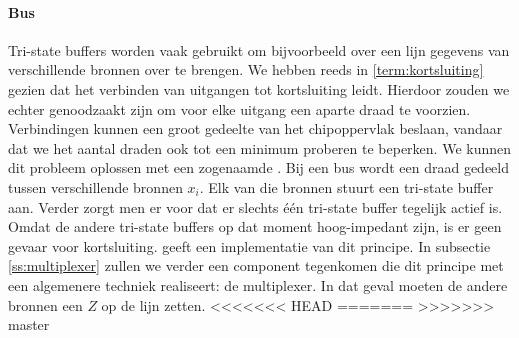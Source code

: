 \paragraph{Bus}Tri-state buffers worden vaak gebruikt om bijvoorbeeld over een lijn gegevens van verschillende bronnen over te brengen. We hebben reeds in \ref{term:kortsluiting} gezien dat het verbinden van uitgangen tot kortsluiting leidt. Hierdoor zouden we echter genoodzaakt zijn om voor elke uitgang een aparte draad te voorzien. Verbindingen kunnen een groot gedeelte van het chipoppervlak beslaan, vandaar dat we het aantal draden ook tot een minimum proberen te beperken. We kunnen dit probleem oplossen met een zogenaamde . Bij een bus wordt een draad gedeeld tussen verschillende bronnen $x_i$. Elk van die bronnen stuurt een tri-state buffer aan. Verder zorgt men er voor dat er slechts \'e\'en tri-state buffer tegelijk actief is. Omdat de andere tri-state buffers op dat moment hoog-impedant zijn, is er geen gevaar voor kortsluiting.  geeft een implementatie van dit principe. In subsectie \ref{ss:multiplexer} zullen we verder een component tegenkomen die dit principe met een algemenere techniek realiseert: de multiplexer. In dat geval moeten de andere bronnen een $Z$ op de lijn zetten.
<<<<<<< HEAD
=======
>>>>>>> master
